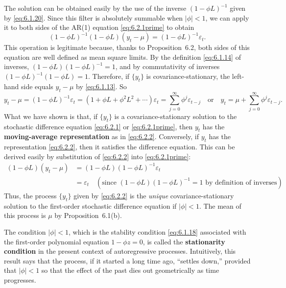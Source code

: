 The solution can be obtained easily by the use of the inverse $(1 - \phi L)^{-1}$ given by
\eqref{eq:6.1.20}. Since this filter is absolutely summable when $|\phi| < 1$, we can apply it to
both sides of the AR(1) equation \eqref{eq:6.2.1prime} to obtain
\[
  (1 - \phi L)^{-1}(1 - \phi L)(y_t - \mu) = (1 - \phi L)^{-1} \varepsilon_t.
\]
This operation is legitimate because, thanks to Proposition~6.2, both sides of this
equation are well defined as mean square limits. By the definition \eqref{eq:6.1.14} of
inverses, $(1 - \phi L)(1 - \phi L)^{-1} = 1$, and by commutativity of inverses $(1 - \phi L)^{-1}(1 -
\phi L) = 1$. Therefore, if $\{y_t\}$ is covariance-stationary, the left-hand side equals $y_t - \mu$
by \eqref{eq:6.1.13}. So
\begin{equation}
  y_t - \mu = (1 - \phi L)^{-1} \varepsilon_t
  = (1 + \phi L + \phi^2 L^2 + \cdots) \varepsilon_t
  = \sum_{j=0}^{\infty} \phi^j \varepsilon_{t-j}
  \quad \text{or} \quad
  y_t = \mu + \sum_{j=0}^{\infty} \phi^j \varepsilon_{t-j}.
  \label{eq:6.2.2}
\end{equation}
What we have shown is that, if $\{y_t\}$ is a covariance-stationary solution to the stochastic
difference equation \eqref{eq:6.2.1} or \eqref{eq:6.2.1prime}, then $y_t$ has the \textbf{moving-average representation}
as in \eqref{eq:6.2.2}. Conversely, if $y_t$ has the representation \eqref{eq:6.2.2}, then
it satisfies the difference equation. This can be derived easily by substitution of
\eqref{eq:6.2.2} into \eqref{eq:6.2.1prime}:
\begin{align*}
  (1 - \phi L)(y_t - \mu) &= (1 - \phi L)(1 - \phi L)^{-1} \varepsilon_t \\
  &= \varepsilon_t \quad (\text{since } (1 - \phi L)(1 - \phi L)^{-1} = 1 \text{ by definition of inverses}).
\end{align*}
Thus, the process $\{y_t\}$ given by \eqref{eq:6.2.2} is the \emph{unique} covariance-stationary solution
to the first-order stochastic difference equation if $|\phi| < 1$. The mean of this process
is $\mu$ by Proposition~6.1(b).

The condition $|\phi| < 1$, which is the stability condition \eqref{eq:6.1.18} associated
with the first-order polynomial equation $1 - \phi z = 0$, is called the \textbf{stationarity
condition} in the present context of autoregressive processes. Intuitively, this result
says that the process, if it started a long time ago, ``settles down,'' provided that
$|\phi| < 1$ so that the effect of the past dies out geometrically as time progresses.

